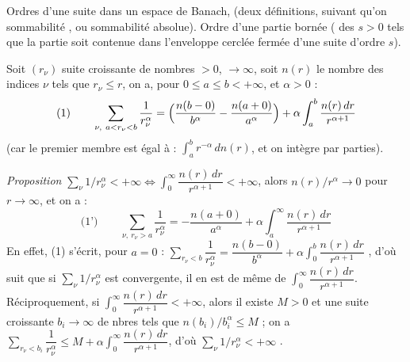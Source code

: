 \documentclass[11pt,a4paper]{article}
\begin{document}
Ordres d'une suite dans un espace de Banach,  (deux définitions, suivant qu'on \struck{\ill{}}  sommabilité \ill{}, ou sommabilité absolue). Ordre d'une partie bornée (  des $s > 0$ tels que la partie soit contenue dans l'enveloppe  cerclée fermée d'une suite d'ordre $s$).


Soit $(r_\nu)$ suite croissante de nombres $> 0$, $\to \infty$, soit $n(r)$ le nombre des indices $\nu$ tels que $r_\nu \leq r$, on a, pour $0 \leq a \leq b < +\infty$, et $\alpha > 0$ :
\[
  \text{(1)}\qquad \sum_{\nu,\ a < r_\nu < b} \frac{1}{r_\nu^{\alpha}} = \Bigl(\frac{n(b-0)}{b^{\alpha}} - \frac{n(a+0)}{a^{\alpha}}\Bigr) + \alpha \int_a^b \frac{n(r)\,dr}{r^{\alpha+1}}
\]
(car le premier membre est égal à : $\int_a^b r^{-\alpha}\,dn(r)$, et on intègre par parties).

\emph{Proposition} $\sum_\nu 1/r_\nu^{\alpha} < +\infty \iff \int_0^{\infty} \dfrac{n(r)\,dr}{r^{\alpha+1}} < +\infty$, alors $n(r)/r^{\alpha} \to 0$ pour $r \to \infty$, et on a :
\[
  \text{(1')}\qquad \sum_{\nu,\ r_\nu > a} \frac{1}{r_\nu^{\alpha}} = -\frac{n(a+0)}{a^{\alpha}} + \alpha \int_a^{\infty} \frac{n(r)\,dr}{r^{\alpha+1}}
\]
  \struck{\ill{}}  En effet, (1) s'écrit, pour $a = 0$ : $\sum_{r_\nu < b} \dfrac{1}{r_\nu^{\alpha}} = \dfrac{n(b-0)}{b^{\alpha}} + \alpha \int_0^b \dfrac{n(r)\,dr}{r^{\alpha+1}}$ , d'où suit que si \struck{\ill{}} $\sum_\nu 1/r_\nu^{\alpha}$ est convergente, il en est de même de $\int_0^{\infty} \dfrac{n(r)\,dr}{r^{\alpha+1}}$. Réciproquement, si $\int_0^{\infty} \dfrac{n(r)\,dr}{r^{\alpha+1}} < +\infty$, alors il existe $M > 0$ et une suite croissante $b_i \to \infty$ de nbres tels que $n(b_i)/b_i^{\alpha} \leq M$ ; \ill{} on a  $\sum_{r_\nu < b_i} \dfrac{1}{r_\nu^{\alpha}} \leq M + \alpha \int_0^{\infty} \dfrac{n(r)\,dr}{r^{\alpha+1}}$, d'où $\sum_\nu 1/r_\nu^{\alpha} < +\infty$ .
\end{document}
